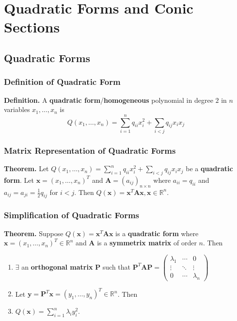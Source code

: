 \documentclass[../ma2001_notes.tex]{subfiles}
\begin{document}
\section{Quadratic Forms and Conic Sections}
\subsection{Quadratic Forms}
\subsubsection{Definition of Quadratic Form}
\textbf{Definition.} A \textbf{quadratic form}/\textbf{homogeneous} polynomial in degree \(2\) in \(n\) variables \(x_1,\ldots,x_n\) is
\[Q(x_1,\ldots,x_n)=\sum_{i=1}^nq_{ii}x_i^2+\sum_{i<j}q_{ij}x_ix_j\]

\subsubsection{Matrix Representation of Quadratic Forms}
\textbf{Theorem.} Let \(Q(x_1,\ldots,x_n)=\sum\limits_{i=1}^nq_{ii}x_i^2+\sum\limits_{i<j}q_{ij}x_ix_j\) be a \textbf{quadratic form}. Let \(\bm{x}=(x_1,\ldots,x_n)^T\) and \(\bm{A}=(a_{ij})_{n\times n}\) where \(a_{ii}=q_{ii}\) and \(a_{ij}=a_{ji}=\displaystyle\frac{1}{2}q_{ij}\) for \(i<j\). Then \(Q(\bm{x})=\bm{x}^T\bm{Ax},\bm{x}\in\mathbb{R}^n\).

\subsubsection{Simplification of Quadratic Forms}
\textbf{Theorem.} Suppose \(Q(\bm{x})=\bm{x}^T\bm{Ax}\) is a \textbf{quadratic form} where \(\bm{x}=(x_1,\ldots,x_n)^T\in\mathbb{R}^n\) and \(\bm{A}\) is a \textbf{symmetrix matrix} of order \(n\). Then
\begin{enumerate}
	\item\(\exists\) an \textbf{orthogonal matrix} \(\bm{P}\) such that \(\bm{P}^T\bm{AP}=\begin{pmatrix}
		\lambda_1 & \cdots & 0 \\
		\vdots & \ddots & \vdots \\
		0 & \cdots & \lambda_n
	\end{pmatrix}\)
	\item Let \(\bm{y}=\bm{P}^T\bm{x}=(y_1,\ldots,y_n)^T\in\mathbb{R}^n\). Then
	\item\(Q(\bm{x})=\sum\limits_{i=1}^n\lambda_iy_i^2\).
\end{enumerate}
\end{document}
